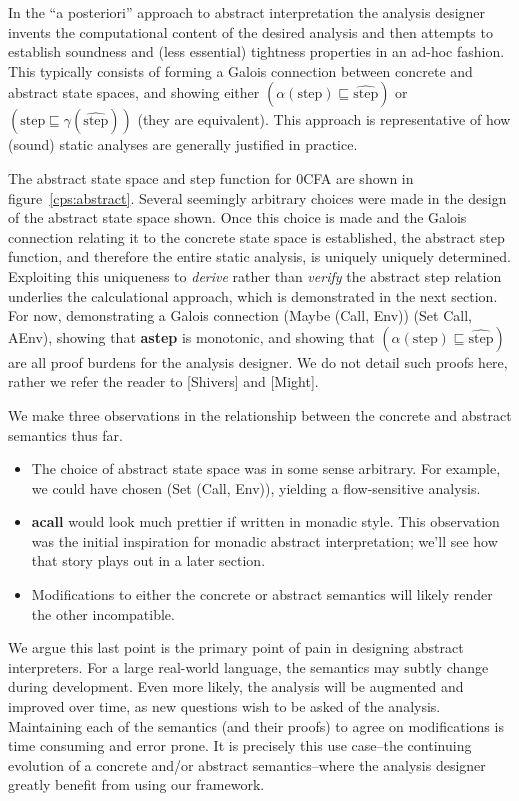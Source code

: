 \documentclass{article}
\begin{document}
In the ``a posteriori'' approach to abstract interpretation the analysis
designer invents the computational content of the desired analysis and then
attempts to establish soundness and (less essential) tightness properties in an
ad-hoc fashion.
%
This typically consists of forming a Galois connection between concrete and
abstract state spaces, and showing either $(\alpha(\text{step}) \sqsubseteq
\widehat{\text{step}})$ or $(\text{step} \sqsubseteq \gamma(\widehat{\text{step}}))$
(they are equivalent).
%
This approach is representative of how (sound) static analyses are generally
justified in practice.

The abstract state space and step function for 0CFA are shown in
figure~\ref{cps:abstract}.
%
Several seemingly arbitrary choices were made in the design of the abstract
state space shown.
%
Once this choice is made and the Galois connection relating it to the concrete
state space is established, the abstract step function, and therefore the
entire static analysis, is uniquely uniquely determined.
%
Exploiting this uniqueness to \textit{derive} rather than \textit{verify} the
abstract step relation underlies the calculational approach, which is
demonstrated in the next section.
%
For now, demonstrating a Galois connection (Maybe (Call, Env))
\galois{\alpha}{\gamma} (Set Call, AEnv), showing that \textbf{astep} is
monotonic, and showing that $(\alpha(\text{step}) \sqsubseteq
\widehat{\text{step}})$ are all proof burdens for the analysis designer.
%
We do not detail such proofs here, rather we refer the reader to [Shivers] and
[Might].

We make three observations in the relationship between the concrete and
abstract semantics thus far.
\begin{itemize}
\item
The choice of abstract state space was in some sense arbitrary.
%
For example, we could have chosen (Set (Call, Env)), yielding a flow-sensitive
analysis.
%
\item
\textbf{acall} would look much prettier if written in monadic style.
%
This observation was the initial inspiration for monadic abstract
interpretation; we'll see how that story plays out in a later section.
%
\item
Modifications to either the concrete or abstract semantics will likely render
the other incompatible.
\end{itemize}
%
We argue this last point is the primary point of pain in designing abstract
interpreters.
%
For a large real-world language, the semantics may subtly change during
development.  Even more likely, the analysis will be augmented and improved
over time, as new questions wish to be asked of the analysis.
%
Maintaining each of the semantics (and their proofs) to agree on modifications
is time consuming and error prone.
%
It is precisely this use case--the continuing evolution of a concrete and/or
abstract semantics--where the analysis designer greatly benefit from using our
framework.
\end{document}
